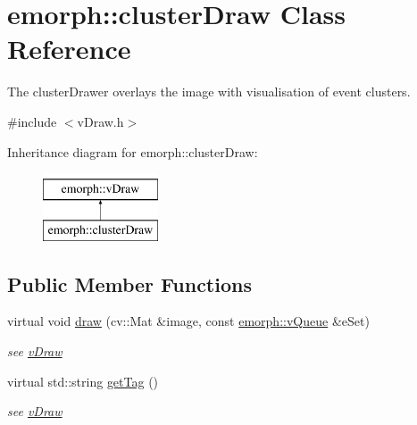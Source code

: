 \hypertarget{classemorph_1_1clusterDraw}{\section{emorph\-:\-:cluster\-Draw Class Reference}
\label{classemorph_1_1clusterDraw}
}


The cluster\-Drawer overlays the image with visualisation of event clusters.  




{\ttfamily \#include $<$v\-Draw.\-h$>$}

Inheritance diagram for emorph\-:\-:cluster\-Draw\-:\begin{figure}[H]
\begin{center}
\leavevmode
\includegraphics[height=2.000000cm]{classemorph_1_1clusterDraw}
\end{center}
\end{figure}
\subsection*{Public Member Functions}
\begin{DoxyCompactItemize}
\item 
\hypertarget{classemorph_1_1clusterDraw_a79e1d35439561ce08431da19a480e88c}{virtual void \hyperlink{classemorph_1_1clusterDraw_a79e1d35439561ce08431da19a480e88c}{draw} (cv\-::\-Mat \&image, const \hyperlink{classemorph_1_1vQueue}{emorph\-::v\-Queue} \&e\-Set)}\label{classemorph_1_1clusterDraw_a79e1d35439561ce08431da19a480e88c}

\begin{DoxyCompactList}\small\item\em see \hyperlink{classemorph_1_1vDraw}{v\-Draw} \end{DoxyCompactList}\item 
\hypertarget{classemorph_1_1clusterDraw_a2b6aff21bcfc2088f8b580ee8a0e74ba}{virtual std\-::string \hyperlink{classemorph_1_1clusterDraw_a2b6aff21bcfc2088f8b580ee8a0e74ba}{get\-Tag} ()}\label{classemorph_1_1clusterDraw_a2b6aff21bcfc2088f8b580ee8a0e74ba}

\begin{DoxyCompactList}\small\item\em see \hyperlink{classemorph_1_1vDraw}{v\-Draw} \end{DoxyCompactList}\end{DoxyCompactItemize}
